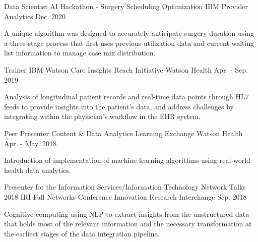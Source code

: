 

\begin{cvpublications}

  \cvpublication
    {Data Scientist} %
    {AI Hackathon - Surgery Scheduling Optimization} %
    {IBM Provider Analytics} %
    {Dec. 2020} %
    {
      \begin{cvparagraph}
       A unique algorithm was designed to accurately anticipate surgery duration using a three-stage process that first uses previous utilization data and current waiting list information to manage case mix distribution.
      \end{cvparagraph}
    }
  \cvpublication
    {Trainer} %
    {IBM Watson Care Insights Reach Initiative} %
    {Watson Health} %
    {Apr. - Sep. 2019} %
    {
      \begin{cvparagraph}
        Analysis of longitudinal patient records and real-time data points through HL7 feeds to provide insights into the patient’s data, and address challenges by integrating within the physician's workflow in the EHR system.
      \end{cvparagraph}
    }
  \cvpublication
    {Peer Presenter} %
    {Content \& Data Analytics Learning Exchange} %
    {Watson Health} %
    {Apr. - May. 2018} %
    {
      \begin{cvparagraph}
        Introduction of implementation of machine learning algorithms using real-world health data analytics.
      \end{cvparagraph}
    }
  \cvpublication
    {Presenter for the Information Services/Information Technology Network Talks} %
    {2018 IRI Fall Networks Conference} %
    {Innovation Research Interchange} %
    {Sep. 2018} %
    {
      \begin{cvparagraph}
        Cognitive computing using NLP to extract insights from the unstructured data that holds most of the relevant information and the necessary transformation at the earliest stages of the data integration pipeline.

\end{cvparagraph}}
\end{cvpublications}
